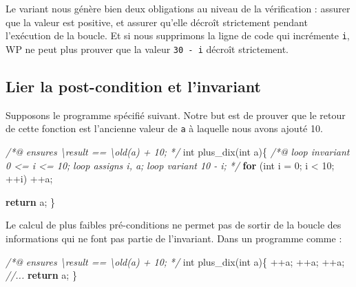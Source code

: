 \documentclass[12pt,francais,]{scrbook}
\newenvironment{Shaded}{}{}
\newcommand{\KeywordTok}[1]{\textcolor[rgb]{0.00,0.44,0.13}{\textbf{{#1}}}}
\newcommand{\DataTypeTok}[1]{\textcolor[rgb]{0.56,0.13,0.00}{{#1}}}
\newcommand{\DecValTok}[1]{\textcolor[rgb]{0.25,0.63,0.44}{{#1}}}
\newcommand{\CommentTok}[1]{\textcolor[rgb]{0.38,0.63,0.69}{\textit{{#1}}}}
\newcommand{\NormalTok}[1]{{#1}}
\begin{document}
Le variant nous génère bien deux obligations au niveau de la
vérification : assurer que la valeur est positive, et assurer qu'elle
décroît strictement pendant l'exécution de la boucle. Et si nous
supprimons la ligne de code qui incrémente \texttt{i}, WP ne peut plus
prouver que la valeur \texttt{30\ -\ i} décroît strictement.

\subsection{Lier la post-condition et
l'invariant}\label{lier-la-post-condition-et-linvariant}

Supposons le programme spécifié suivant. Notre but est de prouver que le
retour de cette fonction est l'ancienne valeur de \texttt{a} à laquelle
nous avons ajouté 10.

\begin{footnotesize}\begin{Shaded}
\begin{Highlighting}[]
\CommentTok{/*@}
\CommentTok{    ensures \textbackslash{}result == \textbackslash{}old(a) + 10;}
\CommentTok{*/}
\DataTypeTok{int} \NormalTok{plus_dix(}\DataTypeTok{int} \NormalTok{a)\{}
    \CommentTok{/*@}
\CommentTok{        loop invariant 0 <= i <= 10;}
\CommentTok{        loop assigns i, a;}
\CommentTok{        loop variant 10 - i;}
\CommentTok{    */}
    \KeywordTok{for} \NormalTok{(}\DataTypeTok{int} \NormalTok{i = }\DecValTok{0}\NormalTok{; i < }\DecValTok{10}\NormalTok{; ++i)}
        \NormalTok{++a;}

    \KeywordTok{return} \NormalTok{a;}
\NormalTok{\}}
\end{Highlighting}
\end{Shaded}\end{footnotesize}

Le calcul de plus faibles pré-conditions ne permet pas de sortir de la
boucle des informations qui ne font pas partie de l'invariant. Dans un
programme comme :

\begin{footnotesize}\begin{Shaded}
\begin{Highlighting}[]
\CommentTok{/*@}
\CommentTok{    ensures \textbackslash{}result == \textbackslash{}old(a) + 10;}
\CommentTok{*/}
\DataTypeTok{int} \NormalTok{plus_dix(}\DataTypeTok{int} \NormalTok{a)\{}
    \NormalTok{++a;}
    \NormalTok{++a;}
    \NormalTok{++a;}
    \CommentTok{//...}
    \KeywordTok{return} \NormalTok{a;}
\NormalTok{\}}
\end{Highlighting}
\end{Shaded}\end{footnotesize}
\end{document}
